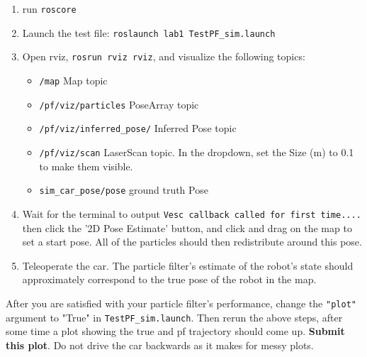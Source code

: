 \documentclass[final]{article}
\begin{document}
\begin{enumerate}
\item run \texttt{roscore}
\item  Launch the test file: \texttt{roslaunch lab1 TestPF\_sim.launch}
\item Open rviz, \texttt{rosrun rviz rviz}, and visualize the following topics:
\begin{itemize}
    \item \texttt{/map} Map topic
    \item \texttt{/pf/viz/particles} PoseArray topic
    \item \texttt{/pf/viz/inferred\_pose/} Inferred Pose topic
    \item \texttt{/pf/viz/scan} LaserScan topic. In the dropdown, set the Size (m) to 0.1 to make them visible.
    \item \texttt{sim\_car\_pose/pose} ground truth Pose
\end{itemize}
\item Wait for the terminal to output \texttt{Vesc callback called for first time....} then click the '2D Pose Estimate' button, and click and drag on the map to set a start pose. All of the particles should then redistribute around this pose.
\item Teleoperate the car. The particle filter's estimate of the robot's state should approximately correspond to the true pose of the robot in the map.
\end{enumerate}
After you are satisfied with your particle filter's performance, change the \texttt{"plot"} argument to "True" in \texttt{TestPF\_sim.launch}. Then rerun the above steps, after some time a plot showing the true and pf trajectory should come up. \textbf{Submit this plot}. Do not drive the car backwards as it makes for messy plots.
\end{document}
